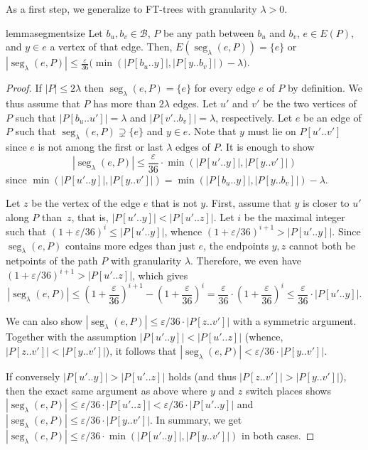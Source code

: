 \documentclass{theoretics}
\newcommand*{\B}{\mathcal{B}}
\DeclareMathOperator{\seg}{seg}
\newcommand*{\length}[1]{|#1|}
\renewcommand{\le}{\leqslant}
\newcommand{\eps}{\varepsilon}
\begin{document}
As a first step, we generalize 
to FT-trees with granularity $\lambda > 0$.

\begin{restatable}{lemma}{segmentsize}
\label{lemma:segment-size} 
  Let $b_u, b_v \in \B$,
  $P$ be any path between $b_u$ and $b_v$, $e \in E(P)$,
  and $y \in e$ a vertex of that edge.
  Then, $E(\seg_{\lambda}(e,P)) = \{e\}$ or 
  $\length{\seg_{\lambda}(e,P)}  
  	\le \frac{\eps}{36} \big(\min(\length{P[b_u..y]}, \length{P[y..b_v]}) - \lambda \big)$. 
\end{restatable}

\begin{proof}
If $|P| \le 2\lambda$ then $\seg_\lambda(e,P) = \{e\}$ for every edge $e$ of $P$ by definition.
We thus assume that $P$ has more than $2\lambda$ edges.
Let $u'$ and $v'$ be the two vertices of $P$ such that $\length{P[b_u..u']}=\lambda$ and $\length{P[v'..b_v]} = \lambda$, respectively. 
Let $e$ be an edge of $P$ such that $\seg_\lambda(e,P) \supsetneq \{e\}$ and $y \in e$.
Note that $y$ must lie on $P[u'..v']$ since $e$ is not among the first or last $\lambda$
edges of $P$.
It is enough to show
\begin{equation*}
	\length{\seg_\lambda(e,P)} \le \frac{\eps}{36} \cdot \min(\length{P[u'..y]}, \length{P[y..v']})
\end{equation*}
since 
$\min(\length{P[u'..y]}, \length{P[y..v']}) = \min(\length{P[b_u..y]}, \length{P[y..b_v]}) - \lambda$.

Let $z$ be the vertex of the edge $e$ that is not $y$.
First, assume that $y$ is closer to $u'$ along $P$ than~$z$,
that is, $|P[u'..y]| < |P[u'.. z]|$.
Let $i$ be the maximal integer such that $(1+\eps/36)^i \le \length{P[u'..y]}$,
whence $(1+\eps/36)^{i+1}>\length{P[u'..y]}$.
Since $\seg_\lambda(e,P)$ contains more edges than just $e$,
the endpoints $y,z$ cannot both be netpoints of the path $P$
with granularity $\lambda$.
Therefore, we even have $(1+\eps/36)^{i+1} > \length{P[u'..z]}$,
which gives
\begin{equation*}
	|\seg_\lambda(e,P)| \le \left(1+\frac{\eps}{36}\right)^{i+1} - \left(1+ \frac{\eps}{36}\right)^i
	 = \frac{\eps}{36} \cdot \left(1+\frac{\eps}{36}\right)^i
	  \le \frac{\eps}{36} \cdot |P[u'..y]|.
\end{equation*}

We can also show $\length{\seg_\lambda(e,P)} \le \eps/36 \cdot \length{P[z..v']}$ with a symmetric argument.
Together with the assumption $|P[u'..y]| < |P[u'.. z]|$ (whence, $\length{P[z..v']} < \length{P[y..v']}$),
it follows that $\length{\seg_\lambda(e,P)} < \eps/36 \cdot \length{P[y..v']}$.

If conversely $|P[u'..y]| > |P[u'.. z]|$ holds (and thus $\length{P[z..v']} > \length{P[y..v']}$),
then the exact same argument as above where $y$ and $z$ switch places
shows $|\seg_\lambda(e,P)| \le \eps/36 \cdot |P[u'..z]| < \eps/36 \cdot |P[u'..y]|$
and $\length{\seg_\lambda(e,P)} \le \eps/36 \cdot \length{P[y..v']}$.
In summary, we get
$\length{\seg_\lambda(e,P)} \le \eps/36 \cdot \min(\length{P[u'..y]}, \length{P[y..v']})$
in both cases.
\end{proof}
\end{document}
